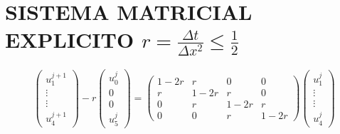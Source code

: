 \documentclass[10pt]{extarticle}
\newenvironment{term}
  {\begin{minipage}{\linewidth}}
  {\end{minipage}\par}
\begin{document}
\begin{term}
    \section*{SISTEMA MATRICIAL EXPLICITO $r=\frac{\Delta t}{\Delta x^2}\leq\frac{1}{2}$}
    $$\begin{pmatrix} u^{j+1}_1\\\vdots\\\vdots\\u_4^{j+1} \end{pmatrix}-r\begin{pmatrix}
        u^j_0\\0\\0\\u_5^j
    \end{pmatrix}=
    \begin{pmatrix}
        1-2r & r & 0 & 0 \\
        r & 1-2r & r & 0 \\
        0 & r & 1-2r & r \\
        0 & 0 & r & 1-2r
    \end{pmatrix}
    \begin{pmatrix} u_1^{j} \\ \vdots \\ \vdots \\ u_4^{j}\end{pmatrix}
    $$
\end{term}

\newpage
\end{document}
